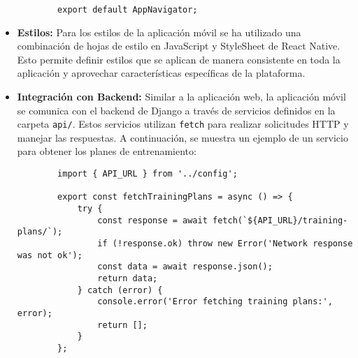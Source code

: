 \begin{itemize}
\begin{verbatim}
        export default AppNavigator;
    \end{verbatim}

    \item \textbf{Estilos:} Para los estilos de la aplicación móvil se ha utilizado una combinación de hojas de estilo en JavaScript y StyleSheet de React Native. Esto permite definir estilos que se aplican de manera consistente en toda la aplicación y aprovechar características específicas de la plataforma.

    \item \textbf{Integración con Backend:} Similar a la aplicación web, la aplicación móvil se comunica con el backend de Django a través de servicios definidos en la carpeta \texttt{api/}. Estos servicios utilizan \texttt{fetch} para realizar solicitudes HTTP y manejar las respuestas. A continuación, se muestra un ejemplo de un servicio para obtener los planes de entrenamiento:
    \begin{verbatim}
        import { API_URL } from '../config';

        export const fetchTrainingPlans = async () => {
            try {
                const response = await fetch(`${API_URL}/training-plans/`);
                if (!response.ok) throw new Error('Network response was not ok');
                const data = await response.json();
                return data;
            } catch (error) {
                console.error('Error fetching training plans:', error);
                return [];
            }
        };
    \end{verbatim}

\end{itemize}
